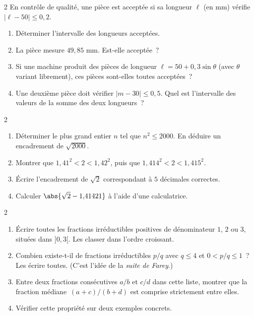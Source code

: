 \begin{probleme}{2}
En contr\^ole de qualit\'e, une pi\`ece est accept\'ee si sa longueur $\ell$ (en mm)
v\'erifie $|\ell - 50| \leq 0{,}2$.
\begin{enumerate}
  \item D\'eterminer l'intervalle des longueurs accept\'ees.
  \item La pi\`ece mesure $49{,}85$ mm. Est-elle accept\'ee~?
  \item Si une machine produit des pi\`eces de longueur $\ell = 50 + 0{,}3\sin\theta$
        (avec $\theta$ variant librement), ces pi\`eces sont-elles toutes accept\'ees~?
  \item Une deuxi\`eme pi\`ece doit v\'erifier $|m - 30| \leq 0{,}5$.
        Quel est l'intervalle des valeurs de la somme des deux longueurs~?
\end{enumerate}
\end{probleme}

\begin{probleme}{2}
\begin{enumerate}
  \item D\'eterminer le plus grand entier $n$ tel que $n^2 \leq 2000$.
        En d\'eduire un encadrement de $\sqrt{2000}$.
  \item Montrer que $1{,}41^2 < 2 < 1{,}42^2$, puis que
        $1{,}414^2 < 2 < 1{,}415^2$.
  \item \'Ecrire l'encadrement de $\sqrt{2}$ correspondant
        \`a $5$ d\'ecimales correctes.
  \item Calculer $\abs{\sqrt{2} - 1{,}41421}$ \`a l'aide d'une calculatrice.
\end{enumerate}
\end{probleme}

\begin{probleme}{2}
\begin{enumerate}
  \item \'Ecrire toutes les fractions irr\'eductibles positives de
        d\'enominateur $1$, $2$ ou $3$, situ\'ees dans $]0, 3[$.
        Les classer dans l'ordre croissant.
  \item Combien existe-t-il de fractions irr\'eductibles $p/q$ avec
        $q \leq 4$ et $0 < p/q \leq 1$~? Les \'ecrire toutes.
        (C'est l'id\'ee de la \emph{suite de Farey}.)
  \item Entre deux fractions cons\'ecutives $a/b$ et $c/d$ dans cette
        liste, montrer que la fraction \og m\'ediane\fg\ $(a+c)/(b+d)$
        est comprise strictement entre elles.
  \item V\'erifier cette propri\'et\'e sur deux exemples concrets.
\end{enumerate}
\end{probleme}

